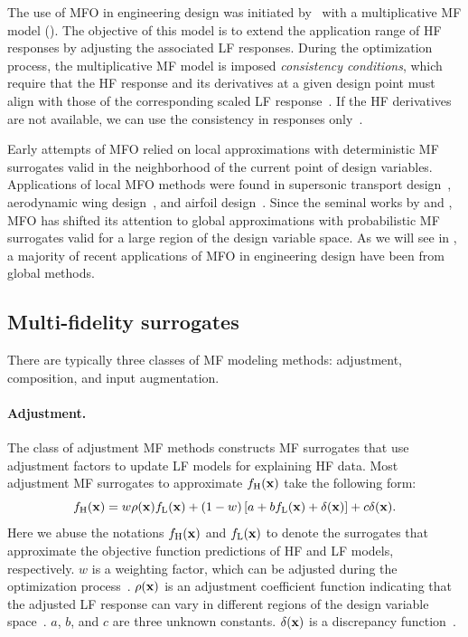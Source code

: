 \documentclass[journal ]{new-aiaa}
\begin{document}
	The use of MFO in engineering design was initiated by~\citet{Haftka1991} with a multiplicative MF model ().
	The objective of this model is to extend the application range of HF responses by adjusting the associated LF responses.
	During the optimization process, the multiplicative MF model is imposed \textit{consistency conditions}, which require that the HF response and its derivatives at a given design point must align with those of the corresponding scaled LF response~\citep{Alexandrov2001}.
	If the HF derivatives are not available, we can use the consistency in responses only~\citep{Rodriguez2001}.
	
	Early attempts of MFO relied on local approximations with deterministic MF surrogates valid in the neighborhood of the current point of design variables.
	Applications of local MFO methods were found in supersonic transport design~\citep{Knill1999}, aerodynamic wing design~\citep{Alexandrov2001}, and airfoil design~\citep{Gano2005}.
	Since the seminal works by \citet{Huang2006smo} and \citet{Forrester2007}, MFO has shifted its attention to global approximations with probabilistic MF surrogates valid for a large region of the design variable space.
	As we will see in , a majority of recent applications of MFO in engineering design have been from global methods.
	
	\subsection{Multi-fidelity surrogates}\label{Sec22}
	
	There are typically three classes of MF modeling methods:
	adjustment, composition, and input augmentation.
	
	\paragraph{Adjustment.}
	The class of adjustment MF methods constructs MF surrogates that use adjustment factors to update LF models for explaining HF data.
	Most adjustment MF surrogates to approximate $f_\text{H}({\bf x})$ take the following form:
	\begin{equation}\label{eqn2}
		f_\text{H}({\bf x}) = w \rho({\bf x}) f_\text{L}({\bf x})\\
		+ (1-w)\left[a + b f_\text{L}({\bf x}) + \delta({\bf x})\right]+ c \delta({\bf x}).
	\end{equation}
	Here we abuse the notations $f_\text{H}({\bf x})$ and $f_\text{L}(\bf x)$ to denote the surrogates that approximate the objective function predictions of HF and LF models, respectively.
	$w$ is a weighting factor, which can be adjusted during the optimization process~\citep{Gano2005}.
	$\rho({\bf {x}})$ is an adjustment coefficient function indicating that the adjusted LF response can vary in different regions of the design variable space~\citep{Haftka1991}.
	$a$, $b$, and $c$ are three unknown constants.
	$\delta({\bf{x}})$ is a discrepancy function~\citep{Kennedy2000}.
	
\end{document}
